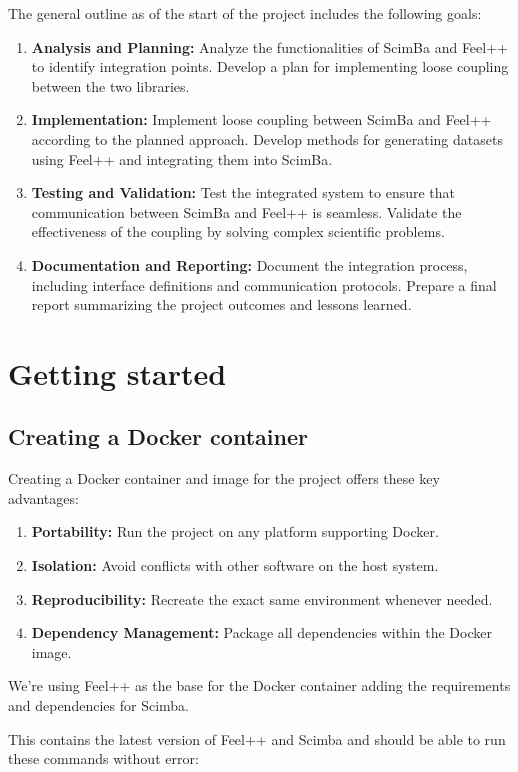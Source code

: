 \documentclass{article}
\begin{document}
The general outline as of the start of the project includes the following goals:

\begin{enumerate}
    \item \textbf{Analysis and Planning:} Analyze the functionalities of ScimBa and Feel++ to identify integration points. Develop a plan for implementing loose coupling between the two libraries.
    \item \textbf{Implementation:} Implement loose coupling between ScimBa and Feel++ according to the planned approach. Develop methods for generating datasets using Feel++ and integrating them into ScimBa.
    \item \textbf{Testing and Validation:} Test the integrated system to ensure that communication between ScimBa and Feel++ is seamless. Validate the effectiveness of the coupling by solving complex scientific problems.
    \item \textbf{Documentation and Reporting:} Document the integration process, including interface definitions and communication protocols. Prepare a final report summarizing the project outcomes and lessons learned.
\end{enumerate}

\section{Getting started}
\subsection{Creating a Docker container}
Creating a Docker container and image for the project offers these key advantages:
\begin{enumerate}
 \item \textbf{Portability:} Run the project on any platform supporting Docker.
 \item \textbf{Isolation:} Avoid conflicts with other software on the host system.
 \item \textbf{Reproducibility:} Recreate the exact same environment whenever needed.
 \item \textbf{Dependency Management:} Package all dependencies within the Docker image.


\end{enumerate}
We're using Feel++ as the base for the Docker container adding the requirements and dependencies for Scimba.

This contains the latest version of Feel++ and Scimba and should be able to run these commands without error:
\end{document}
